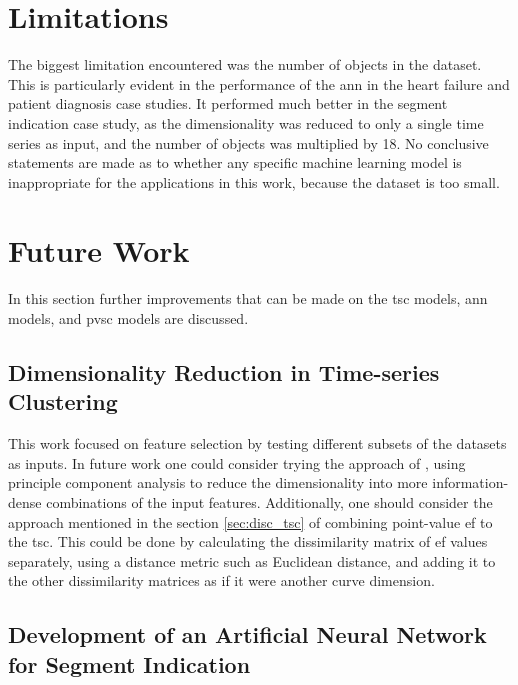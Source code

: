 \section{Limitations}

The biggest limitation encountered was the number of objects in the dataset. This is particularly evident in the performance of the \acrshort{ann} in the heart failure and patient diagnosis case studies. It performed much better in the segment indication case study, as the dimensionality was reduced to only a single time series as input, and the number of objects was multiplied by 18. No conclusive statements are made as to whether any specific machine learning model is inappropriate for the applications in this work, because the dataset is too small. 

\section{Future Work}

In this section further improvements that can be made on the \acrshort{tsc} models, \acrshort{ann} models, and \acrshort{pvsc} models are discussed. 

\subsection*{Dimensionality Reduction in Time-series Clustering}

This work focused on feature selection by testing different subsets of the datasets as inputs. In future work one could consider trying the approach of \cite{hf_diagnosis_ml}, using principle component analysis to reduce the dimensionality into more information-dense combinations of the input features. Additionally, one should consider the approach mentioned in the section \ref{sec:disc_tsc} of combining point-value \acrshort{ef} to the \acrshort{tsc}. This could be done by calculating the dissimilarity matrix of \acrshort{ef} values separately, using a distance metric such as Euclidean distance, and adding it to the other dissimilarity matrices as if it were another curve dimension.

\subsection*{Development of an Artificial Neural Network for Segment Indication}

